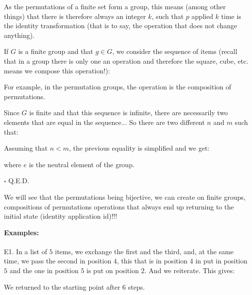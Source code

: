 	\begin{theorem}
	As the permutations of a finite set form a group, this means (among other things) that there is therefore always an integer $k$, such that $p$ applied $k$ time is the identity transformation (that is to say, the operation that does not change anything).
	\end{theorem}
	\begin{dem}
	If $G$ is a finite group and that $g\in G$, we consider the sequence of items (recall that in a group there is only one an operation and therefore the square, cube, etc. means we compose this operation!):
	
	For example, in the permutation groups, the operation is the composition of permutations.
	
	Since $G$ is finite and that this sequence is infinite, there are necessarily two elements that are equal in the sequence... So there are two different $n$ and $m$ such that:
	
	Assuming that $n<m$, the previous equality is simplified and we get:
	
	where $e$ is the neutral element of the group.
	\begin{flushright}
		$\square$  Q.E.D.
	\end{flushright}
	\end{dem}
	We will see that the permutations being bijective, we can create on finite groups, compositions of permutations operations that always end up returning to the initial state (identity application id)!!!
	\begin{tcolorbox}[colframe=black,colback=white,sharp corners]
	\textbf{{\Large {}}Examples:}\\\\
	E1. In a list of $5$ items, we exchange the first and the third, and, at the same time, we pass the second in position $4$, this that is in position $4$ in put in position $5$ and the one in position $5$ is put on position $2$. And we reiterate. This gives:
	
	We returned to the starting point after $6$ steps.
	\end{tcolorbox}
	
